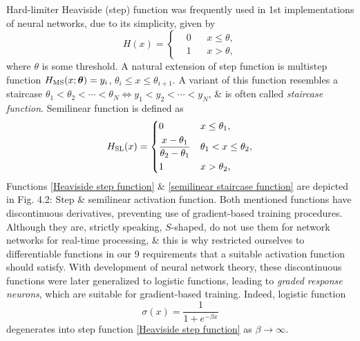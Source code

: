 \documentclass{article}
\begin{document}
\begin{enumerate}
\begin{itemize}
\begin{itemize}
			Hard-limiter Heaviside (step) function was frequently used in 1st implementations of neural networks, due to its simplicity, given by
			\begin{equation}
				\label{Heaviside step function}
				H(x) = \left\{\begin{split}
					&0&&x\le\theta,\\
					&1&&x > \theta,
				\end{split}\right.
			\end{equation}
			where $\theta$ is some threshold. A natural extension of step function is multistep function $H_{\rm MS}(x;\boldsymbol{\theta}) = y_i$, $\theta_i\le x\le\theta_{i+1}$. A variant of this function resembles a staircase $\theta_1 < \theta_2 < \cdots < \theta_N\Leftrightarrow y_1 < y_2 < \cdots < y_N$, \& is often called {\it staircase function}. Semilinear function is defined as
			\begin{equation}
				\label{semilinear staircase function}
				H_{\rm SL}(x) = \left\{\begin{split}
					&0&&x\le\theta_1,\\
					&\frac{x - \theta_1}{\theta_2 - \theta_1}&&\theta_1 < x\le\theta_2,\\
					&1&&x > \theta_2,
				\end{split}\right.
			\end{equation}
			Functions \eqref{Heaviside step function} \& \eqref{semilinear staircase function} are depicted in {\sf Fig. 4.2: Step \& semilinear activation function.} Both mentioned functions have discontinuous derivatives, preventing use of gradient-based training procedures. Although they are, strictly speaking, $S$-shaped, do not use them for network networks for real-time processing, \& this is why restricted ourselves to differentiable functions in our 9 requirements that a suitable activation function should satisfy. With development of neural network theory, these discontinuous functions were later generalized to logistic functions, leading to {\it graded response neurons}, which are suitable for gradient-based training. Indeed, logistic function
			\begin{equation}
				\label{logistic function}
				\sigma(x) = \frac{1}{1 + e^{-\beta x}}
			\end{equation}
			degenerates into step function \eqref{Heaviside step function} as $\beta\to\infty$.
			

\end{itemize}
\end{itemize}
\end{enumerate}
\end{document}
